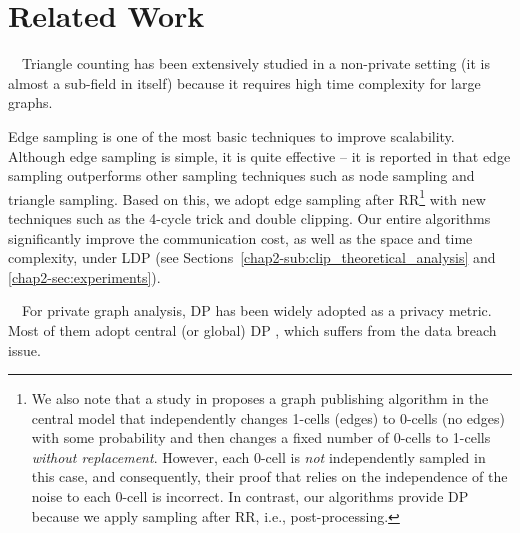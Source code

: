 \section{Related Work}
\label{chap2-sec:related}
~~Triangle
counting has been extensively studied in a non-private setting \cite{Bera_KDD20,Bera_PODS20,Chu_KDD11,Eden_FOCS15,Seshadhri_SDM13,Suri_WWW11,Tsourakakis_KDD09,Wu_TKDE16} 
(it is almost a sub-field in itself)
because it requires high time complexity for large graphs.

Edge sampling \cite{Bera_PODS20,Eden_FOCS15,Tsourakakis_KDD09,Wu_TKDE16} is one of the most basic techniques to improve 
scalability.
Although edge sampling is simple, it is quite effective -- it is reported in \cite{Wu_TKDE16} that edge sampling outperforms other sampling techniques such as node sampling and triangle sampling.
Based on this, we adopt edge sampling after RR\footnote{We also note that a study in \cite{Nguyen_TDP16} proposes a graph publishing algorithm in the central model that independently changes 1-cells (edges) to 0-cells (no edges) with some probability and then 
changes a fixed number of 0-cells to 1-cells \textit{without replacement}. 
However, each 0-cell is \textit{not} independently sampled in this case, and consequently, 
their proof that relies on the independence of the noise to each 0-cell is incorrect. 
In contrast, our algorithms provide DP because we apply sampling after RR, i.e., post-processing.} 
with new techniques such as the 4-cycle trick and double clipping.
Our entire algorithms significantly improve the communication cost, as well as the space and time complexity, under LDP (see Sections~\ref{chap2-sub:clip_theoretical_analysis}
and \ref{chap2-sec:experiments}).

\smallskip
{}~~For private graph analysis, DP has been widely adopted as a privacy metric.
Most of them adopt central (or global) DP
\cite{Day_SIGMOD16,Ding_TKDE21,Hay_ICDM09,Karwa_PVLDB11,Kasiviswanathan_TCC13,Raskhodnikova_arXiv15,Zhang_SIGMOD15}, 
which suffers from the data breach issue.

